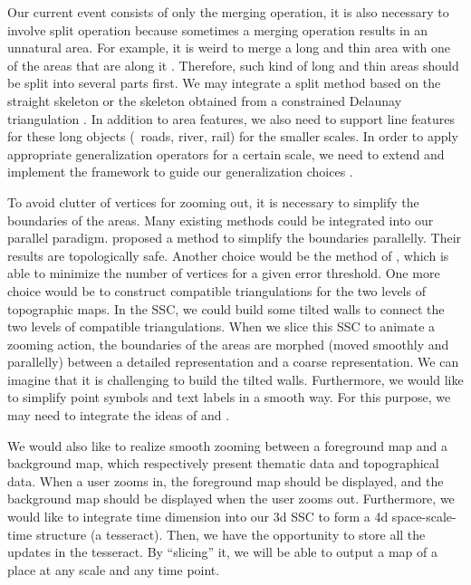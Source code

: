 \documentclass[]{interact}
\begin{document}
Our current event consists of only the merging operation,
it is also necessary to involve split operation
because sometimes a merging operation results in an unnatural area.
For example, it is weird to merge a long and thin area 
with one of the areas that are along it
\citep[see][]{Haunert2008Skeleton}.
Therefore, such kind of long and thin areas should be
split into several parts first.
We may integrate a split method based on the straight skeleton
\citep{Haunert2008Skeleton}
or the skeleton obtained from a constrained Delaunay triangulation
\citep{Meijers2016Split}.
In addition to area features, we also need to support line features 
for these long objects (\eg~roads, river, rail) for the smaller scales.
In order to apply appropriate generalization operators
for a certain scale,
we need to extend and implement the framework 
to guide our generalization choices
\citep{Meijers2018Framework}.


To avoid clutter of vertices for zooming out, 
it is necessary to simplify the boundaries of the areas.
Many existing methods could be integrated into our parallel paradigm.
\citet{Meijers2011LineSimp} proposed a method 
to simplify the boundaries parallelly. 
Their results are topologically safe. 
Another choice would be the method of \citet{ImaiIri1988},
which is able to minimize the number of vertices 
for a given error threshold.
One more choice would be to construct compatible triangulations 
\citep[see][]{Peng2019Thesis}
for the two levels of topographic maps.
In the SSC, we could build some tilted walls 
to connect the two levels of compatible triangulations.
When we slice this SSC to animate a zooming action,
the boundaries of the areas are morphed 
(moved smoothly and parallelly)
between a detailed representation and a coarse representation.
We can imagine that it is challenging to build the tilted walls.
Furthermore, we would like to 
simplify point symbols and text labels in a smooth way.
For this purpose, we may need to integrate the ideas of
\citet{Haunert2017Label} and \citet{sahw-oarps-ICAGW13}.

We would also like to realize smooth zooming
between a foreground map and a background map,
which respectively present thematic data and topographical data.
When a user zooms in, the foreground map should be displayed,
and the background map should be displayed when the user zooms out.
Furthermore, we would like to integrate time dimension into our 3d SSC
to form a 4d space-scale-time structure (a tesseract).
Then, we have the opportunity to store all the updates in the tesseract.
By ``slicing'' it, we will be able to output a map of a place 
at any scale and any time point.
\end{document}
